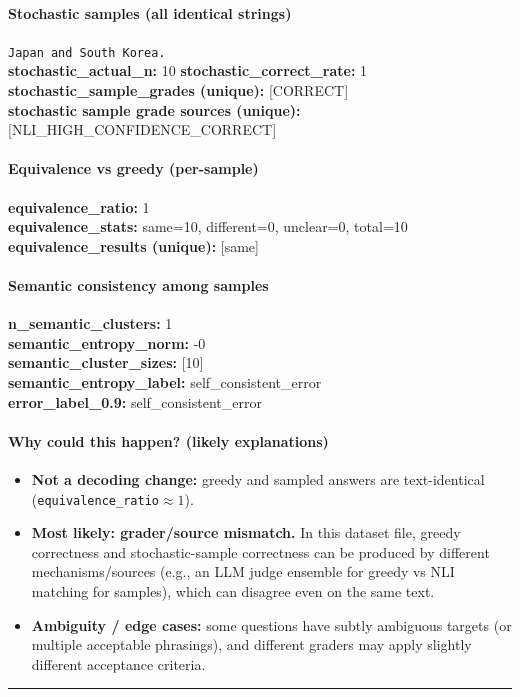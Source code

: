 \documentclass[11pt]{article}
\newcommand{\mono}[1]{\texttt{#1}}
\begin{document}
\paragraph{Stochastic samples (all identical strings)}
\mono{Japan and South Korea.}\\
\textbf{stochastic\_actual\_n:} 10 \quad \textbf{stochastic\_correct\_rate:} 1\\
\textbf{stochastic\_sample\_grades (unique):} [CORRECT]\\
\textbf{stochastic sample grade sources (unique):} [NLI\_HIGH\_CONFIDENCE\_CORRECT]\\
\paragraph{Equivalence vs greedy (per-sample)}
\textbf{equivalence\_ratio:} 1\\
\textbf{equivalence\_stats:} same=10, different=0, unclear=0, total=10\\
\textbf{equivalence\_results (unique):} [same]\\
\paragraph{Semantic consistency among samples}
\textbf{n\_semantic\_clusters:} 1\\
\textbf{semantic\_entropy\_norm:} -0\\
\textbf{semantic\_cluster\_sizes:} [10]\\
\textbf{semantic\_entropy\_label:} self\_consistent\_error\\
\textbf{error\_label\_0.9:} self\_consistent\_error\\
\paragraph{Why could this happen? (likely explanations)}
\begin{itemize}\item \textbf{Not a decoding change:} greedy and sampled answers are text-identical (\mono{equivalence\_ratio}$\approx 1$).\item \textbf{Most likely: grader/source mismatch.} In this dataset file, greedy correctness and stochastic-sample correctness can be produced by different mechanisms/sources (e.g., an LLM judge ensemble for greedy vs NLI matching for samples), which can disagree even on the same text.\item \textbf{Ambiguity / edge cases:} some questions have subtly ambiguous targets (or multiple acceptable phrasings), and different graders may apply slightly different acceptance criteria.\end{itemize}
\vspace{10pt}
\hrule
\vspace{10pt}
\end{document}
